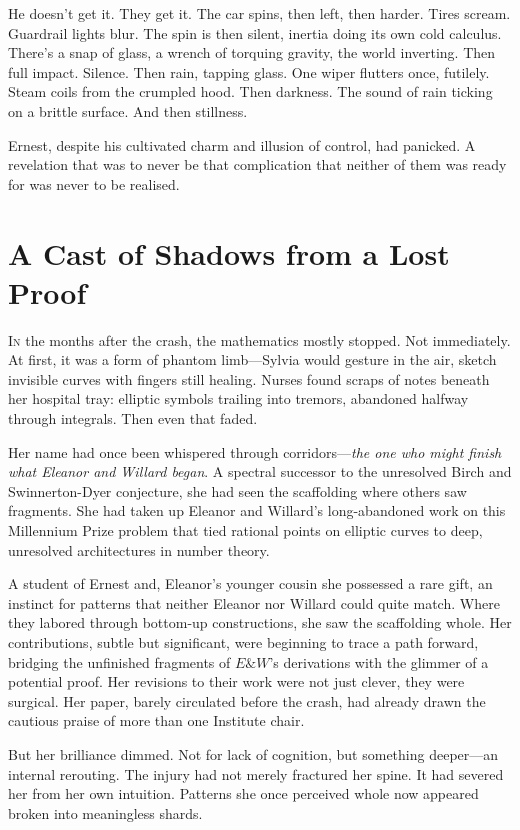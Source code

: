 He doesn’t get it. They get it. The car spins, then left, then harder. Tires scream. Guardrail lights blur. The spin is then silent, inertia doing its own cold calculus. There’s a snap of glass, a wrench of torquing gravity, the world inverting. Then full impact. Silence. Then rain, tapping glass. One wiper flutters once, futilely. Steam coils from the crumpled hood. Then darkness. The sound of rain ticking on a brittle surface. And then stillness.

Ernest, despite his cultivated charm and illusion of control, had panicked. A revelation that was to never be that complication that neither of them was ready for was never to be realised. 

\section*{A Cast of Shadows from a Lost Proof}

\lettrine{I}n the months after the crash, the mathematics mostly stopped. Not immediately. At first, it was a form of phantom limb—Sylvia would gesture in the air, sketch invisible curves with fingers still healing. Nurses found scraps of notes beneath her hospital tray: elliptic symbols trailing into tremors, abandoned halfway through integrals. Then even that faded.

Her name had once been whispered through corridors—\textit{the one who might finish what Eleanor and Willard began}. A spectral successor to the unresolved Birch and Swinnerton-Dyer conjecture, she had seen the scaffolding where others saw fragments. She had taken up Eleanor and Willard’s long-abandoned work on this Millennium Prize problem that tied rational points on elliptic curves to deep, unresolved architectures in number theory. 

A student of Ernest and, Eleanor’s younger cousin she possessed a rare gift, an instinct for patterns that neither Eleanor nor Willard could quite match. Where they labored through bottom-up constructions, she saw the scaffolding whole.  
Her contributions, subtle but significant, were beginning to trace a path forward, bridging the unfinished fragments of \(E \& W\)'s derivations with the glimmer of a potential proof. Her revisions to their work were not just clever, they were surgical. Her paper, barely circulated before the crash, had already drawn the cautious praise of more than one Institute chair.

But her brilliance dimmed. Not for lack of cognition, but something deeper—an internal rerouting. The injury had not merely fractured her spine. It had severed her from her own intuition. Patterns she once perceived whole now appeared broken into meaningless shards.

